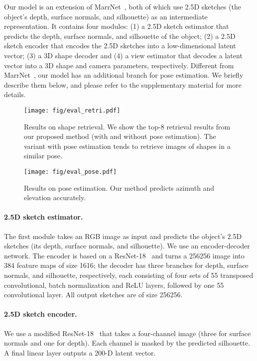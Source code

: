 \documentclass[10pt,twocolumn,letterpaper]{article}
\newcommand{\myparagraph}[1]{\vspace{-14pt}\paragraph{#1}}
\begin{document}
Our model is an extension of MarrNet~\cite{marrnet}, both of which use 2.5D sketches (the object's depth, surface normals, and silhouette) as an intermediate representation. It contains four modules: (1) a 2.5D sketch estimator that predicts the depth, surface normals, and silhouette of the object; (2) a 2.5D sketch encoder that encodes the 2.5D sketches into a low-dimensional latent vector; (3) a 3D shape decoder and (4) a view estimator that decodes a latent vector into a 3D shape and camera parameters, respectively. Different from MarrNet~\cite{marrnet}, our model has an additional branch for pose estimation. We briefly describe them below, and please refer to the supplementary material for more details.

\begin{figure*}[t]
\centering
\texttt{[image: fig/eval\_retri.pdf]}
\vspace{-20pt}
\caption{Results on shape retrieval. We show the top-8 retrieval results from our proposed method (with and without pose estimation). The variant with pose estimation tends to retrieve images of shapes in a similar pose.}
\vspace{-10pt}
\label{fig:eval_retri}
\end{figure*} \begin{figure*}[t]
\centering
\texttt{[image: fig/eval\_pose.pdf]}
\vspace{-20pt}
\caption{Results on pose estimation. Our method predicts azimuth and elevation accurately.}
\vspace{-15pt}
\label{fig:eval_pose}
\end{figure*} 
\myparagraph{2.5D sketch estimator.}
The first module takes an RGB image as input and predicts the object's 2.5D sketches (its depth, surface normals, and silhouette). We use an encoder-decoder network. The encoder is based on a ResNet-18~\cite{He2015Deep} and turns a 256256 image into 384 feature maps of size 1616; the decoder has three branches for depth, surface normals, and silhouette, respectively, each consisting of four sets of 55 transposed convolutional, batch normalization and ReLU layers, followed by one 55 convolutional layer. All output sketches are of size 256256.

\myparagraph{2.5D sketch encoder.}
We use a modified ResNet-18~\cite{He2015Deep} that takes a four-channel image (three for surface normals and one for depth). Each channel is masked by the predicted silhouette. A final linear layer outputs a 200-D latent vector.
\end{document}
